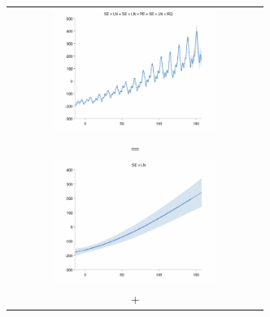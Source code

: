 \documentclass[twoside]{article}
\begin{document}
\begin{figure}[h!]
\centering
\newcommand{\wagd}{8cm}  %
\newcommand{\hagd}{4cm}  %
\begin{tabular}{c}
 \includegraphics[width=\wagd,height=\hagd]{../figures/decomposition/01-airline-months_max_level_8/01-airline-months_all} \\ 
 = \\ 
 \includegraphics[width=\wagd,height=\hagd]{../figures/decomposition/01-airline-months_max_level_8/01-airline-months_1} \\
 + \\

\end{tabular}
\end{figure}
\end{document}

